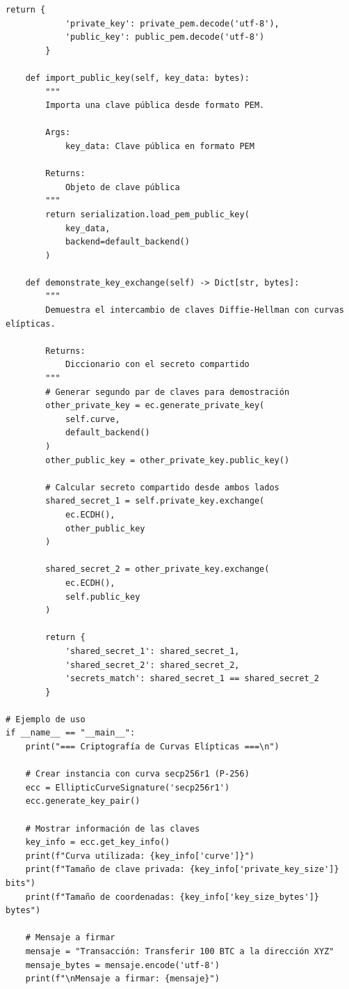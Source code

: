 \documentclass[12pt,a4paper]{article}
\begin{document}
\begin{lstlisting}[caption=Implementación de firma digital con curvas elípticas]
        return {
            'private_key': private_pem.decode('utf-8'),
            'public_key': public_pem.decode('utf-8')
        }
    
    def import_public_key(self, key_data: bytes):
        """
        Importa una clave pública desde formato PEM.
        
        Args:
            key_data: Clave pública en formato PEM
            
        Returns:
            Objeto de clave pública
        """
        return serialization.load_pem_public_key(
            key_data,
            backend=default_backend()
        )
    
    def demonstrate_key_exchange(self) -> Dict[str, bytes]:
        """
        Demuestra el intercambio de claves Diffie-Hellman con curvas elípticas.
        
        Returns:
            Diccionario con el secreto compartido
        """
        # Generar segundo par de claves para demostración
        other_private_key = ec.generate_private_key(
            self.curve,
            default_backend()
        )
        other_public_key = other_private_key.public_key()
        
        # Calcular secreto compartido desde ambos lados
        shared_secret_1 = self.private_key.exchange(
            ec.ECDH(), 
            other_public_key
        )
        
        shared_secret_2 = other_private_key.exchange(
            ec.ECDH(), 
            self.public_key
        )
        
        return {
            'shared_secret_1': shared_secret_1,
            'shared_secret_2': shared_secret_2,
            'secrets_match': shared_secret_1 == shared_secret_2
        }

# Ejemplo de uso
if __name__ == "__main__":
    print("=== Criptografía de Curvas Elípticas ===\n")
    
    # Crear instancia con curva secp256r1 (P-256)
    ecc = EllipticCurveSignature('secp256r1')
    ecc.generate_key_pair()
    
    # Mostrar información de las claves
    key_info = ecc.get_key_info()
    print(f"Curva utilizada: {key_info['curve']}")
    print(f"Tamaño de clave privada: {key_info['private_key_size']} bits")
    print(f"Tamaño de coordenadas: {key_info['key_size_bytes']} bytes")
    
    # Mensaje a firmar
    mensaje = "Transacción: Transferir 100 BTC a la dirección XYZ"
    mensaje_bytes = mensaje.encode('utf-8')
    print(f"\nMensaje a firmar: {mensaje}")
    

\end{lstlisting}
\end{document}
